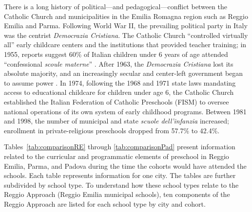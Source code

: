 There is a long history of political---and pedagogical---conflict between the Catholic Church and municipalities in the Emilia Romagna region such as Reggio Emilia and Parma. Following World War II, the prevailing political party in Italy was the centrist \textit{Democrazia Cristiana}. The Catholic Church ``controlled virtually all'' early childcare centers and the institutions that provided teacher training; in 1955, reports suggest 60\% of Italian children under 6 years of age attended ``confessional \textit{scoule materne}'' \citep{Hohnerlein_2015_Development-and-Diffusion}. After 1963, the \textit{Democrazia Cristiana} lost its absolute majority, and an increasingly secular and center-left government began to assume power \citep{Hohnerlein_2009_Paradox-Public-Preschools}. In 1974, following the 1968 and 1971 state laws mandating access to educational childcare for children under age 6, the Catholic Church established the Italian Federation of Catholic Preschools (FISM) to oversee national operations of its own system of early childhood programs. Between 1981 and 1998, the number of municipal and state \textit{scuole dell'infanzia} increased; enrollment in private-religious preschools dropped from 57.7\% to 42.4\%.

Tables~\ref{tab:comparisonRE} through \ref{tab:comparisonPad} present information related to the curricular and programmatic elements of preschool in Reggio Emilia, Parma, and Padova during the time the cohorts would have attended the schools. Each table represents information for one city. The tables are further subdivided by school type. To understand how these school types relate to the Reggio Approach (Reggio Emilia municipal schools), ten components of the Reggio Approach are listed for each school type by city and cohort. 

